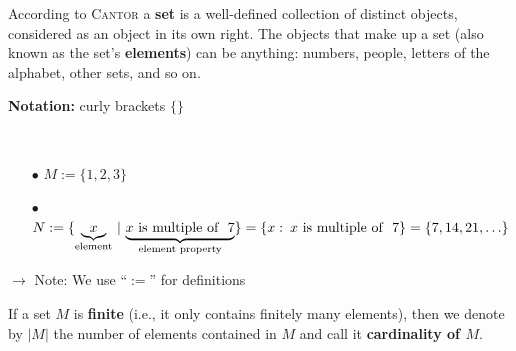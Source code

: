 
\begin{frame}
 \begin{defi}[Set]\label{def:set}
 	According to \textsc{Cantor} a \textbf{set} is a well-defined collection of distinct objects, considered as an object in its own right. The objects that make up a set (also known as the set's \textbf{elements}) can be anything: numbers, people, letters of the alphabet, other sets, and so on. 	 
 \end{defi}
\vspace{0.1cm}
 \textbf{Notation:} curly brackets $\{ \}$
 \vspace{0.1cm}
 \begin{ex} \label{ex:sets}~\\
 	\blank
 	\begin{itemize}
 		\blank
 		\item[\blank$\bullet$] $M := \{ 1,2,3 \}$
 		\item[\blank$\bullet$] $N := \{ \underbrace{x}_{\text{\scriptsize element}} \,|\, \underbrace{\text{$x$ is multiple of } ~7}_{\text{\scriptsize element property}} \}= \{ x \,\colon\, \text{$x$ is multiple of }~ 7 \} = \{7,14,21,\ldots\}$ \vspace{0.2cm}
 	\end{itemize}
  $\rightarrow$ Note: We use ``$:=$'' for definitions\\
 \end{ex}
\vspace{0.6cm}
\begin{defi}[Cardinality]\label{def:cardinality}
If a set $M$ is \textbf{finite} (i.e., it only contains finitely many elements), then we denote by $|M|$ the number of elements contained in $M$ and call it \textbf{cardinality of $M$}.
\end{defi}
\end{frame}

